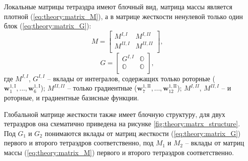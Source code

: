 \documentclass[a4paper,14pt]{article}
\begin{document}
Локальные матрицы тетраэдра имеют блочный вид, матрица массы является плотной (\ref{eq:theory:matrix_M}), а в матрице жесткости ненулевой только один блок (\ref{eq:theory:matrix_G}):
\begin{equation}
	M = \left[
	\begin{matrix}
		M^{I, I} & M^{I, II} \\
		M^{II, I} & M^{II, II} \\
	\end{matrix}
	\right] , \label{eq:theory:matrix_M}
\end{equation}
\begin{equation}
	G = \left[
	\begin{matrix}
		G^{I, I} & \mathbb{O} \\
		 \mathbb{O} &  \mathbb{O} \\
	\end{matrix}
	\right] , \label{eq:theory:matrix_G}
\end{equation}
где $M^{I, I}$, $G^{I, I}$ -- вклады от интегралов, содержащих только роторные ($\mathbf{w}_{1}^{1,\mathrm{I}}, ..., \mathbf{w}_{6}^{1,\mathrm{I}}$); $M^{II, II}$ -- только градиентные ($\mathbf{w}_{7}^{1,\mathrm{II}}, ..., \mathbf{w}_{12}^{1,\mathrm{II}}$); $M^{I, II}$, $M^{II, I}$ -- и роторные, и градиентные базисные функции.

Глобальной матрице жесткости также имеет блочную структуру, для двух тетраэдров она схематично приведена на рисунке \ref{fig:theory:matrx_structure}. Под $G_1$ и $G_2$ понимаются вклады от матриц жесткости (\ref{eq:theory:matrix_G}) первого и второго тетраэдров соответственно, под $M_1$ и $M_2$ -- вклады от матриц массы (\ref{eq:theory:matrix_M}) первого и второго тетраэдров соответственно.
\end{document}
